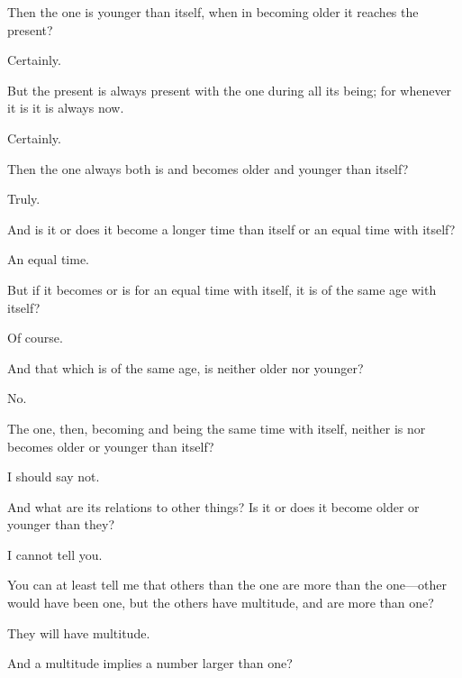\documentclass[11pt,letter]{article}
\begin{document}
\par  Then the one is younger than itself, when in becoming older it reaches the present?

\par  Certainly.

\par  But the present is always present with the one during all its being; for whenever it is it is always now.

\par  Certainly.

\par  Then the one always both is and becomes older and younger than itself?

\par  Truly.

\par  And is it or does it become a longer time than itself or an equal time with itself?

\par  An equal time.

\par  But if it becomes or is for an equal time with itself, it is of the same age with itself?

\par  Of course.

\par  And that which is of the same age, is neither older nor younger?

\par  No.

\par  The one, then, becoming and being the same time with itself, neither is nor becomes older or younger than itself?

\par  I should say not.

\par  And what are its relations to other things? Is it or does it become older or younger than they?

\par  I cannot tell you.

\par  You can at least tell me that others than the one are more than the one—other would have been one, but the others have multitude, and are more than one?

\par  They will have multitude.

\par  And a multitude implies a number larger than one?
\end{document}
